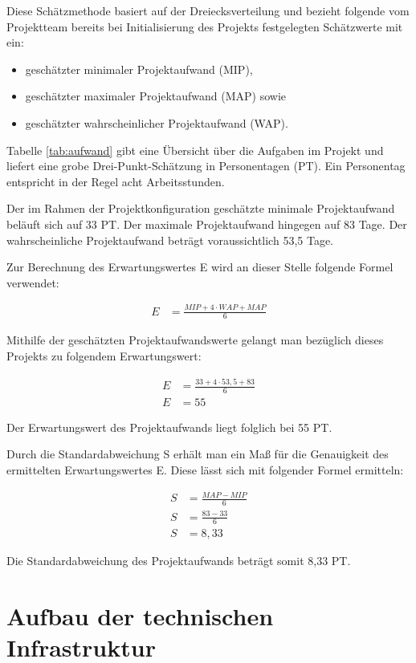 \documentclass[a4paper,11pt,listof=numbered,glossary=totoc,parskip=half,toc=bib]{scrreprt}
\begin{document}
{Diese Schätzmethode basiert auf der Dreiecksverteilung und bezieht folgende vom Projektteam bereits bei Initialisierung des Projekts festgelegten Schätzwerte mit ein:

\begin{itemize}
	\item geschätzter minimaler Projektaufwand (MIP),
	\item geschätzter maximaler Projektaufwand (MAP) sowie
	\item geschätzter wahrscheinlicher Projektaufwand (WAP).
\end{itemize}

Tabelle \ref{tab:aufwand} gibt eine Übersicht über die Aufgaben im Projekt und liefert eine grobe Drei-Punkt-Schätzung in Personentagen (PT). Ein Personentag entspricht in der Regel acht Arbeitsstunden.

Der im Rahmen der Projektkonfiguration geschätzte minimale Projektaufwand beläuft sich auf 33 PT. Der maximale Projektaufwand hingegen
auf 83 Tage. Der wahrscheinliche Projektaufwand beträgt voraussichtlich 53,5 Tage. 

Zur Berechnung des Erwartungswertes E wird an dieser Stelle folgende Formel verwendet:

\begin{align}
E &= \frac{MIP + 4 \cdot WAP + MAP}{6}
\end{align}

Mithilfe der geschätzten Projektaufwandswerte gelangt man bezüglich dieses Projekts zu folgendem Erwartungswert:

\begin{align}
E &= \frac{33 + 4 \cdot 53,5 + 83}{6}\\
E &= 55
\end{align}

Der Erwartungswert des Projektaufwands liegt folglich bei 55 PT.

Durch die Standardabweichung S erhält man ein Maß für die Genauigkeit des ermittelten Erwartungswertes E. Diese lässt sich mit folgender Formel ermitteln:

\begin{align}
S &= \frac{MAP - MIP}{6} \\
S &= \frac{83 - 33}{6} \\
S &= 8,33
\end{align}

Die Standardabweichung des Projektaufwands beträgt somit 8,33 PT.
	
	\newpage
	\section{Aufbau der technischen Infrastruktur}

}
\end{document}
